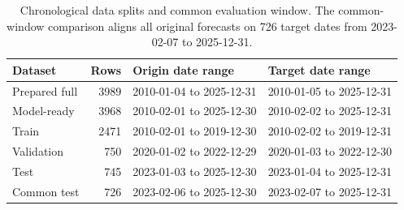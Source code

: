 \begin{table}[!t]
\centering
\caption{Chronological data splits and common evaluation window. The common-window comparison aligns all original forecasts on 726 target dates from 2023-02-07 to 2025-12-31.}
\label{tab:data-splits}
\scriptsize
\setlength{\tabcolsep}{3pt}
\begin{tabular}{@{}l r L{0.31\columnwidth} L{0.31\columnwidth}@{}}
\toprule
Dataset & Rows & Origin date range & Target date range \\
\midrule
Prepared full & 3989 & 2010-01-04 to 2025-12-31 & 2010-01-05 to 2025-12-31 \\
Model-ready & 3968 & 2010-02-01 to 2025-12-30 & 2010-02-02 to 2025-12-31 \\
Train & 2471 & 2010-02-01 to 2019-12-30 & 2010-02-02 to 2019-12-31 \\
Validation & 750 & 2020-01-02 to 2022-12-29 & 2020-01-03 to 2022-12-30 \\
Test & 745 & 2023-01-03 to 2025-12-30 & 2023-01-04 to 2025-12-31 \\
Common test & 726 & 2023-02-06 to 2025-12-30 & 2023-02-07 to 2025-12-31 \\
\bottomrule
\end{tabular}
\end{table}
